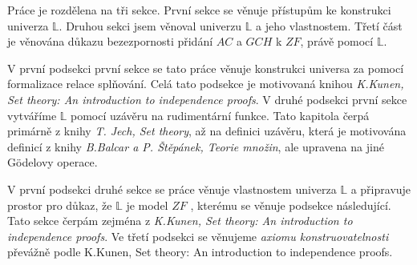 \documentclass[12pt,a4paper]{article}
\begin{document}
Pr\'{a}ce je rozd\v{e}lena na t\v{r}i sekce. Prvn\'{i} sekce se v\v{e}nuje p\v{r}\'{i}stup\r{u}m ke konstrukci univerza $\mathbb{L}$. Druhou sekci jsem v\v{e}noval univerzu $\mathbb{L}$ a jeho vlastnostem. T\v{r}et\'{i} \v{c}\'{a}st je v\v{e}nov\'{a}na d\r{u}kazu bezezpornosti p\v{r}id\'{a}n\'{i} $ AC $ a $ GCH$  k $ ZF$, pr\'{a}v\v{e} pomoc\'{i} $\mathbb{L}$.

V prvn\'{i} podsekci prvn\'{i} sekce se tato pr\'{a}ce v\v{e}nuje konstrukci universa za pomoc\'{i} formalizace relace spl\v{n}ov\'{a}n\'{i}. Cel\'{a} tato podsekce je motivovan\'{a} knihou  \textit{K.Kunen, Set theory: An introduction to independence proofs}.
V druh\'{e} podsekci prvn\'{i} sekce vytv\'{a}\v{r}\'{i}me $\mathbb{L}$ pomoc\'{i} uz\'{a}v\v{e}ru na rudiment\'{a}rn\'{i} funkce. Tato kapitola \v{c}erp\'{a} prim\'{a}rn\v{e} z knihy \textit{T. Jech, Set theory}, a\v{z} na  definici uz\'{a}v\v{e}ru, kter\'{a} je motivov\'{a}na definic\'{i} z knihy \textit{B.Balcar a P. \v{S}t\v{e}p\'{a}nek, Teorie mno\v{z}in}, ale upravena na jin\'{e} G\"{o}delovy operace.

V prvn\'{i} podsekci druh\'{e} sekce se pr\'{a}ce v\v{e}nuje vlastnostem univerza $\mathbb{L}$ a p\v{r}ipravuje prostor pro d\r{u}kaz, \v{z}e $\mathbb{L}$ je model $ ZF$ , kter\'{e}mu se v\v{e}nuje podsekce n\'{a}sleduj\'{i}c\'{i}. Tato sekce \v{c}erp\'{a}m zejm\'{e}na z \textit{K.Kunen, Set theory: An introduction to independence proofs}. 
Ve t\v{r}et\'{i} podsekci se v\v{e}nujeme \textit{axiomu konstruovatelnosti} p\v{r}ev\'{a}\v{z}n\v{e} podle {K.Kunen, Set theory: An introduction to independence proofs}.
\end{document}
